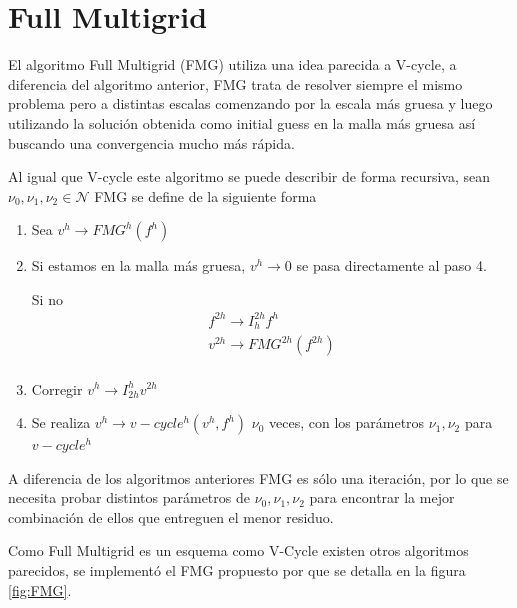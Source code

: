\documentclass[letter, 10pt]{article}
\begin{document}
\section{Full Multigrid}

El algoritmo Full Multigrid (FMG) utiliza una idea parecida a V-cycle, a diferencia del algoritmo anterior, FMG trata de resolver siempre el mismo problema pero a distintas escalas comenzando por la escala
más gruesa y luego utilizando la solución obtenida como initial guess en la malla más gruesa así buscando una convergencia mucho más rápida.

Al igual que V-cycle este algoritmo se puede describir de forma recursiva, sean $\nu_0, \nu_1, \nu_2 \in \mathcal{N}$ FMG se define de la siguiente forma

\begin{enumerate}
    \item Sea $v^h \rightarrow FMG^h(f^h)$
    
    \item Si estamos en la malla más gruesa, $v^h \rightarrow 0$ se pasa directamente al paso 4.
    
    Si no 
    \begin{align}
         f^{2h} \rightarrow I_{h}^{2h} f^h\\
         v^{2h} \rightarrow FMG^{2h}(f^{2h})\\
    \end{align}
    \item Corregir $v^h \rightarrow I_{2h}^h{v^{2h}}$
    \item Se realiza $v^{h} \rightarrow v-cycle^h(v^{h},f^{h})$ $\nu_0$ veces, con los parámetros $\nu_1,\nu_2$ para $v-cycle^{h}$
\end{enumerate}

A diferencia de los algoritmos anteriores FMG es sólo una iteración, por lo que se necesita probar distintos parámetros de $\nu_0,\nu_1,\nu_2$ para encontrar la mejor combinación de ellos que entreguen el menor residuo.


Como Full Multigrid es un esquema como V-Cycle existen otros algoritmos parecidos, se implementó el FMG propuesto por  \cite{ye2001nonlinear}  que se detalla en la figura \ref{fig:FMG}.
\end{document}
